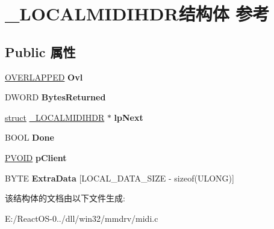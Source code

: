 \hypertarget{struct___l_o_c_a_l_m_i_d_i_h_d_r}{}\section{\+\_\+\+L\+O\+C\+A\+L\+M\+I\+D\+I\+H\+D\+R结构体 参考}
\label{struct___l_o_c_a_l_m_i_d_i_h_d_r}
\subsection*{Public 属性}
\begin{DoxyCompactItemize}
\item 
\mbox{\label{struct___l_o_c_a_l_m_i_d_i_h_d_r_aba66d344656a933218d4d38008ac88dd}} 
\hyperlink{struct___o_v_e_r_l_a_p_p_e_d}{O\+V\+E\+R\+L\+A\+P\+P\+ED} {\bfseries Ovl}
\item 
\mbox{\label{struct___l_o_c_a_l_m_i_d_i_h_d_r_a510ea6cb80af16840666e4a5da6b6529}} 
D\+W\+O\+RD {\bfseries Bytes\+Returned}
\item 
\mbox{\label{struct___l_o_c_a_l_m_i_d_i_h_d_r_aff465461f769a69cd36382d96f55ef9e}} 
\hyperlink{interfacestruct}{struct} \hyperlink{struct___l_o_c_a_l_m_i_d_i_h_d_r}{\+\_\+\+L\+O\+C\+A\+L\+M\+I\+D\+I\+H\+DR} $\ast$ {\bfseries lp\+Next}
\item 
\mbox{\label{struct___l_o_c_a_l_m_i_d_i_h_d_r_acd7db097dc9d8c234378d47cb7956c5f}} 
B\+O\+OL {\bfseries Done}
\item 
\mbox{\label{struct___l_o_c_a_l_m_i_d_i_h_d_r_ab5b7f3e2c92f1354b06de5b89eb4dc04}} 
\hyperlink{interfacevoid}{P\+V\+O\+ID} {\bfseries p\+Client}
\item 
\mbox{\label{struct___l_o_c_a_l_m_i_d_i_h_d_r_a421cbd648b455a807391de739b4eee9d}} 
B\+Y\+TE {\bfseries Extra\+Data} \mbox{[}L\+O\+C\+A\+L\+\_\+\+D\+A\+T\+A\+\_\+\+S\+I\+ZE -\/ sizeof(U\+L\+O\+NG)\mbox{]}
\end{DoxyCompactItemize}


该结构体的文档由以下文件生成\+:\begin{DoxyCompactItemize}
\item 
E\+:/\+React\+O\+S-\/0../dll/win32/mmdrv/midi.\+c\end{DoxyCompactItemize}
